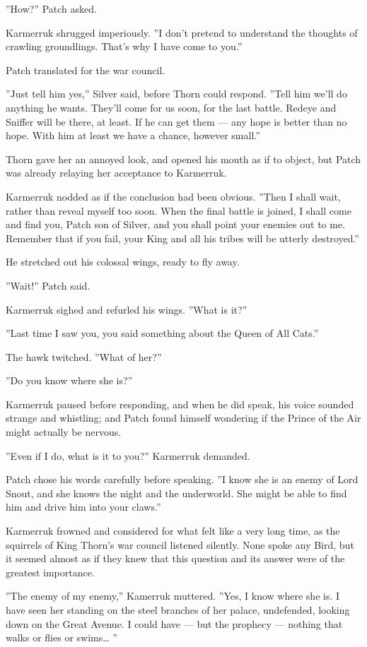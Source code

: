 \documentclass[12pt]{book}
\begin{document}
''How?'' Patch asked.

Karmerruk shrugged imperiously. ''I don't pretend to understand the
thoughts of crawling groundlings. That's why I have come to you.''

Patch translated for the war council.

''Just tell him yes,'' Silver said, before Thorn could respond. ''Tell
him we'll do anything he wants. They'll come for us soon, for the last
battle. Redeye and Sniffer will be there, at least. If he can get them
--- any hope is better than no hope. With him at least we have a
chance, however small.''

Thorn gave her an annoyed look, and opened his mouth as if to object,
but Patch was already relaying her acceptance to Karmerruk.

Karmerruk nodded as if the conclusion had been obvious. ''Then I shall
wait, rather than reveal myself too soon. When the final battle is
joined, I shall come and find you, Patch son of Silver, and you shall
point your enemies out to me. Remember that if you fail, your King and
all his tribes will be utterly destroyed.''

He stretched out his colossal wings, ready to fly away.

''Wait!'' Patch said.

Karmerruk sighed and refurled his wings. ''What is it?''

''Last time I saw you, you said something about the Queen of All
Cats.''

The hawk twitched. ''What of her?''

''Do you know where she is?''

Karmerruk paused before responding, and when he did speak, his voice
sounded strange and whistling; and Patch found himself wondering if
the Prince of the Air might actually be nervous.

''Even if I do, what is it to you?'' Karmerruk demanded.

Patch chose his words carefully before speaking. ''I know she is an
enemy of Lord Snout, and she knows the night and the underworld. She
might be able to find him and drive him into your claws.''

Karmerruk frowned and considered for what felt like a very long time,
as the squirrels of King Thorn's war council listened silently. None
spoke any Bird, but it seemed almost as if they knew that this
question and its answer were of the greatest importance.

''The enemy of my enemy,'' Kamerruk muttered. ''Yes, I know where she
is. I have seen her standing on the steel branches of her palace,
undefended, looking down on the Great Avenue. I could have --- but the
prophecy --- nothing that walks or flies or swims\ldots{} ''
\end{document}
